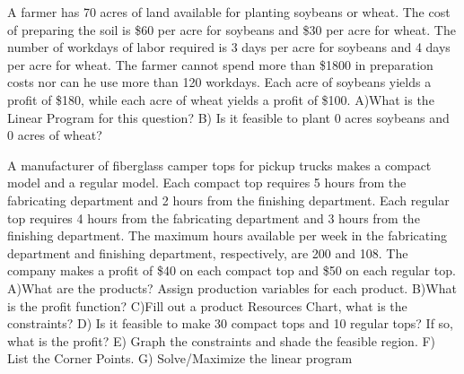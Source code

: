 \documentclass[11pt,epsfig]{article}
\begin{document}
\begin{problem}{20}
A farmer has 70 acres of land available for planting soybeans or wheat. The cost of preparing the soil is \$60 per acre for soybeans and \$30 per acre for wheat. The number of workdays of labor required is 3 days per acre for soybeans and 4 days per acre for wheat. The farmer cannot spend more than \$1800 in preparation costs nor can he use more than 120 workdays. Each acre of soybeans yields a profit of \$180, while each acre of wheat yields a profit of \$100.
\newline
A)What is the Linear Program for this question?
\newline
B) Is it feasible to plant 0 acres soybeans and 0 acres of wheat?

\vfill
\end{problem}

\newpage

\begin{problem}{45}
A manufacturer of fiberglass camper tops for pickup trucks makes a compact model and a regular model. Each compact top requires 5 hours from the fabricating department and 2 hours from the finishing department. Each regular top requires 4 hours from the fabricating department and 3 hours from the finishing department. The maximum hours available per week in the fabricating department and finishing department, respectively, are 200 and 108. The company makes a profit of \$40 on each compact top and \$50 on each regular top.
\newline
\newline
A)What are the products? Assign production variables for each product.
\vfill
B)What is the profit function?
\vfill
C)Fill out a product Resources Chart, what is the constraints?
\vfill
D) Is it feasible to make 30 compact tops and 10 regular tops? If so, what is the profit?
\vfill 
\newpage
E) Graph the constraints and shade the feasible region.
\vfill
F) List the Corner Points.
\vfill
G) Solve/Maximize the linear program


\vfill
\end{problem}










\showpoints
\end{document}
